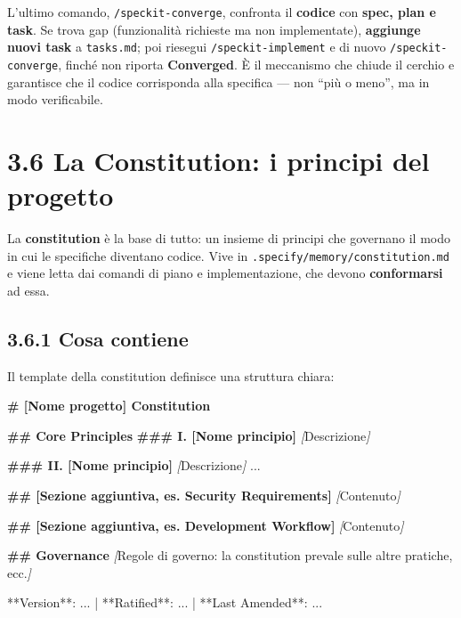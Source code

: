 \documentclass[
  italian,
  10pt,
]{book}
\newenvironment{Shaded}{\begin{snugshade}}{\end{snugshade}}
\newcommand{\CommentTok}[1]{\textcolor[rgb]{0.56,0.35,0.01}{\textit{#1}}}
\newcommand{\FunctionTok}[1]{\textcolor[rgb]{0.13,0.29,0.53}{\textbf{#1}}}
\newcommand{\NormalTok}[1]{#1}
\newcommand{\OtherTok}[1]{\textcolor[rgb]{0.56,0.35,0.01}{#1}}
\begin{document}
L'ultimo comando, \texttt{/speckit-converge}, confronta il
\textbf{codice} con \textbf{spec, plan e task}. Se trova gap
(funzionalità richieste ma non implementate), \textbf{aggiunge nuovi
task} a \texttt{tasks.md}; poi riesegui \texttt{/speckit-implement} e di
nuovo \texttt{/speckit-converge}, finché non riporta \textbf{Converged}.
È il meccanismo che chiude il cerchio e garantisce che il codice
corrisponda alla specifica --- non ``più o meno'', ma in modo
verificabile.

\section{3.6 La Constitution: i principi del
progetto}\label{la-constitution-i-principi-del-progetto}

La \textbf{constitution} è la base di tutto: un insieme di principi che
governano il modo in cui le specifiche diventano codice. Vive in
\texttt{.specify/memory/constitution.md} e viene letta dai comandi di
piano e implementazione, che devono \textbf{conformarsi} ad essa.

\subsection{3.6.1 Cosa contiene}\label{cosa-contiene}

Il template della constitution definisce una struttura chiara:

\begin{Shaded}
\begin{Highlighting}[]
\FunctionTok{\# [Nome progetto] Constitution}

\FunctionTok{\#\# Core Principles}
\FunctionTok{\#\#\# I. [Nome principio]}
\CommentTok{[}\OtherTok{Descrizione}\CommentTok{]}

\FunctionTok{\#\#\# II. [Nome principio]}
\CommentTok{[}\OtherTok{Descrizione}\CommentTok{]}
\NormalTok{...}

\FunctionTok{\#\# [Sezione aggiuntiva, es. Security Requirements]}
\CommentTok{[}\OtherTok{Contenuto}\CommentTok{]}

\FunctionTok{\#\# [Sezione aggiuntiva, es. Development Workflow]}
\CommentTok{[}\OtherTok{Contenuto}\CommentTok{]}

\FunctionTok{\#\# Governance}
\CommentTok{[}\OtherTok{Regole di governo: la constitution prevale sulle altre pratiche, ecc.}\CommentTok{]}

\NormalTok{**Version**: ... | **Ratified**: ... | **Last Amended**: ...}
\end{Highlighting}
\end{Shaded}
\end{document}
